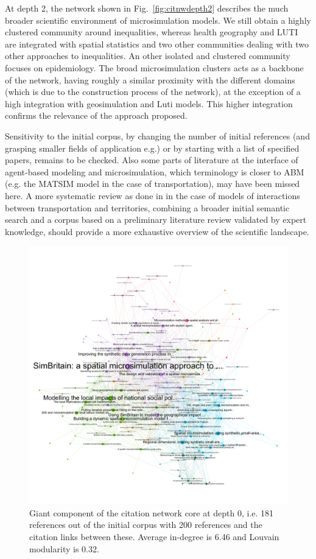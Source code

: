 At depth 2, the network shown in Fig.~\ref{fig:citnwdepth2} describes the much broader scientific environment of microsimulation models. We still obtain a highly clustered community around inequalities, whereas health geography and LUTI are integrated with spatial statistics and two other communities dealing with two other approaches to inequalities. An other isolated and clustered community focuses on epidemiology. The broad microsimulation clusters acts as a backbone of the network, having roughly a similar proximity with the different domains (which is due to the construction process of the network), at the exception of a high integration with geosimulation and Luti models. This higher integration confirms the relevance of the approach proposed.

Sensitivity to the initial corpus, by changing the number of initial references (and grasping smaller fields of application e.g.) or by starting with a list of specified papers, remains to be checked. Also some parts of literature at the interface of agent-based modeling and microsimulation, which terminology is closer to ABM (e.g. the MATSIM model in the case of transportation), may have been missed here. A more systematic review as done in \cite{raimbault2018caracterisation} in the case of models of interactions between transportation and territories, combining a broader initial semantic search and a corpus based on a preliminary literature review validated by expert knowledge, should provide a more exhaustive overview of the scientific landscape.


\begin{figure}
  \includegraphics[width=\linewidth]{figures/microsim_depth0.png}
  \caption{Giant component of the citation network core at depth 0, i.e. 181 references out of the initial corpus with 200 references and the citation links between these. Average in-degree is 6.46 and Louvain modularity is 0.32.}
  \label{fig:citnwdepth0}
\end{figure}


